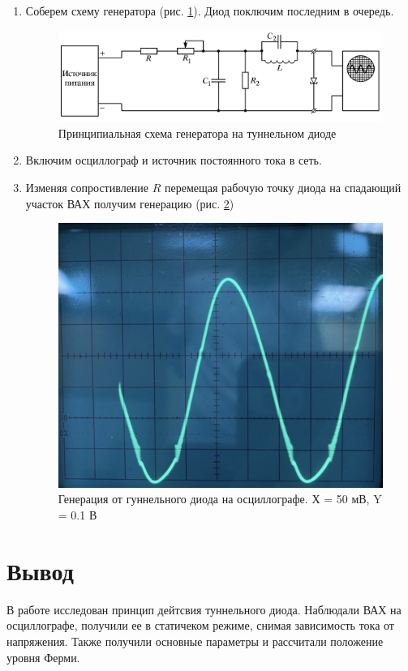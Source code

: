 \documentclass[a4paper]{article}
\begin{document}
\begin{enumerate}
    \item Соберем схему генератора (рис. \ref{gen}). Диод поключим последним в очередь.

        \begin{figure}[h]
            \begin{center}
                \includegraphics[scale = 0.8]{gen.png}
                \caption{Принципиальная схема генератора на туннельном диоде}
                \label{gen}
            \end{center}
        \end{figure}

    \item Включим осциллограф и источник постоянного тока в сеть.
    \item Изменяя сопростивление $R$ перемещая рабочую точку диода на спадающий участок ВАХ получим генерацию (рис. \ref{gen1})

    \begin{figure}[H]
        \begin{center}
            \includegraphics[scale = 0.2]{gen1.jpg}
            \caption{Генерация от гуннельного диода на осциллографе. Х = 50 мВ, Y = 0.1 В}
            \label{gen1}
        \end{center}
    \end{figure}

\end{enumerate}


\section{Вывод}
В работе исследован принцип дейтсвия туннельного диода. Наблюдали ВАХ на осциллографе, получили ее в статичеком режиме, снимая зависимость тока от напряжения. Также 
получили основные параметры и рассчитали положение уровня Ферми.
\end{document}
